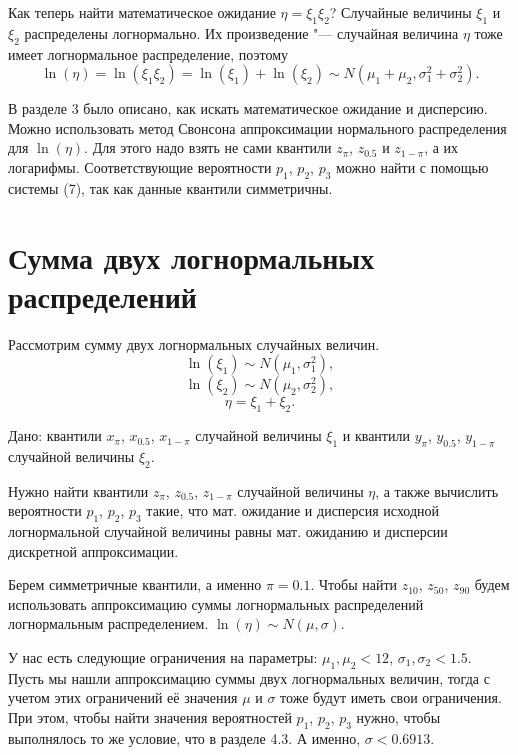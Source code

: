 \documentclass[12pt]{article}
\begin{document}
	
	
	Как теперь найти математическое ожидание $\eta = \xi_{1}\xi_{2}$?
	Случайные величины $\xi_{1}$ и $\xi_{2}$ распределены логнормально. Их произведение "--- случайная величина $\eta$ тоже имеет логнормальное распределение, поэтому
	\begin{equation*}
		\ln(\eta) = \ln(\xi_{1}\xi_{2}) = \ln(\xi_{1}) + \ln(\xi_{2}) \sim N(\mu_{1} + \mu_{2}, \sigma _{1}^{2} + \sigma _{2}^{2}).
	\end{equation*}
	
	В разделе 3 было описано, как искать математическое ожидание и дисперсию.
	Можно использовать метод Свонсона аппроксимации нормального распределения для $\ln(\eta)$. Для этого надо взять не сами квантили $z_{\pi}$, $z_{0.5}$ и  $z_{1-\pi}$, а их логарифмы. 
	Соответствующие вероятности $p_{1}$, $p_{2}$, $p_{3}$
	можно найти с помощью системы (7), так как данные квантили симметричны.
	
	
	\section{Сумма двух логнормальных распределений}
	
	Рассмотрим сумму двух логнормальных случайных величин.
	\begin{equation*}
		\ln(\xi_{1}) \sim N(\mu_{1}, \sigma _{1}^{2}),
	\end{equation*}
	\begin{equation*}
		\ln(\xi_{2}) \sim N(\mu_{2}, \sigma _{2}^{2}),
	\end{equation*}
	\begin{equation*}
		\eta = \xi_{1}+\xi_{2}.
	\end{equation*}
	
	Дано: квантили $x_{\pi}$, $x_{0.5}$, $x_{1-\pi}$ случайной величины $\xi_1$ и  квантили $y_{\pi}$, $y_{0.5}$, $y_{1-\pi}$ случайной величины $\xi_2$.
	
	Нужно найти квантили $z_{\pi}$, $z_{0.5}$, $z_{1-\pi}$ случайной величины $\eta$, а также вычислить вероятности $p_{1}$, $p_{2}$, $p_{3}$ такие, что мат. ожидание и дисперсия исходной логнормальной случайной величины равны мат. ожиданию и дисперсии дискретной аппроксимации.
	
	Берем симметричные квантили, а именно $\pi = 0.1$. Чтобы найти $z_{10}$, $z_{50}$, $z_{90}$ будем использовать аппроксимацию суммы логнормальных распределений логнормальным распределением. $\ln(\eta)\sim N(\mu, \sigma)$.
	
	У нас есть следующие ограничения на параметры: $\mu_{1}, \mu_{2} < 12$, $\sigma_{1}, \sigma_{2} < 1.5$. Пусть мы нашли аппроксимацию суммы двух логнормальных величин, тогда с учетом этих ограничений её значения $\mu$ и $\sigma$ тоже будут иметь свои ограничения. При этом, чтобы найти значения вероятностей $p_{1}$, $p_{2}$, $p_{3}$ нужно, чтобы выполнялось то же условие, что в разделе 4.3. А именно, $\sigma < 0.6913.$
	
\end{document}
